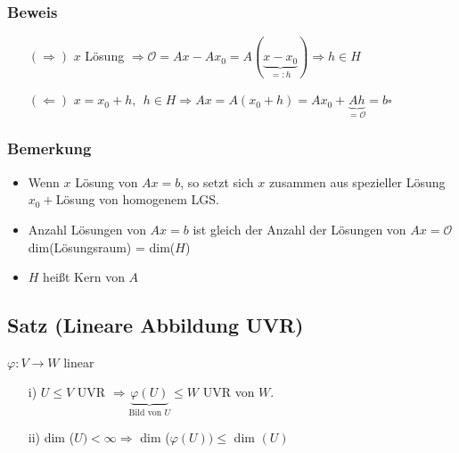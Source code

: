 \documentclass[a4paper, 12pt,titlepage, pdf, headsepline]{article}
\newcommand{\qed}{\hfill$\square$}
\renewcommand{\>}{\rightarrow}
\renewcommand{\*}{\cdot}
\renewcommand{\O}{\mathcal{O}}
\renewcommand{\phi}{\varphi}
\begin{document}
		      			\subsubsection*{Beweis}
		      			\begin{itemize}
		      				\item[$(\Rightarrow)$] $x$ Lösung $\Rightarrow\O = Ax -Ax_0 = A(\underbrace{x-x_0}_{=:h}) \Rightarrow h \in H$
		      				\item[$(\Leftarrow)$] $x= x_0 + h,~~h \in H \Rightarrow Ax = A(x_0 + h) = Ax_0 + \underbrace{Ah}_{=\O} = b$\qed
		      			\end{itemize}
		      			\subsubsection*{Bemerkung}
		      			\begin{itemize}
		      				\item Wenn $x$ Lösung von $Ax = b$, so setzt sich $x$ zusammen aus spezieller Lösung $x_0 + $Lösung von homogenem LGS.
		      				\item Anzahl Lösungen von $Ax = b$ ist gleich der Anzahl der Lösungen von $Ax = \O$\\
		      				      dim(Lösungsraum) = dim($H$)
		      				\item $H$ heißt Kern von $A$
		      			\end{itemize}
		      			\subsection{Satz (Lineare Abbildung UVR)}
		      			\label{6.7}
		      			$\phi: V \rightarrow W$ linear
		      			\begin{itemize}
		      				\item[i)] $U \leq V$ UVR $\Rightarrow \underbrace{\phi(U)}_{\text{Bild von }U} \leq W $ UVR von $W$.
		      				\item[ii)]
		      				      dim ($U) < \infty \Rightarrow$ dim ($\phi(U)) \leq$ dim $(U)$
		      			\end{itemize}
\end{document}
